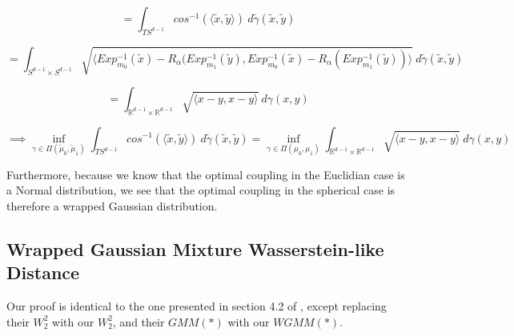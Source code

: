 \documentclass[]{article}
\begin{document}

\begin{equation*}
	= \int_{TS^{d-1}} cos^{-1}(\langle \tilde{x}, \tilde{y} \rangle) \ d\tilde{\gamma}(\tilde{x},\tilde{y})
\end{equation*}

\begin{equation*}
	= \int_{S^{d-1}\times S^{d-1}} \sqrt{\langle Exp_{m_0}^{-1}(\tilde{x}) - R_\alpha(Exp_{m_1}^{-1}(\tilde{y}), Exp_{m_0}^{-1}(\tilde{x}) - R_\alpha(Exp_{m_1}^{-1}(\tilde{y})) \rangle} \ d\tilde{\gamma}(\tilde{x},\tilde{y})
\end{equation*}


\begin{equation*}
	= \int_{\mathbb{R}^{d-1} \times \mathbb{R}^{d-1}} \sqrt{ \langle x - y, x-y\rangle} \ d\gamma(x,y)
\end{equation*}


\begin{equation}
	\implies \inf_{\gamma \in \Pi(\tilde{\mu}_0, \tilde{\mu}_1)} \int_{TS^{d-1}} cos^{-1}(\langle \tilde{x}, \tilde{y} \rangle) \ d\tilde{\gamma}(\tilde{x},\tilde{y}) = \inf_{\gamma \in \Pi({\mu}_0, {\mu}_1)} \int_{\mathbb{R}^{d-1} \times \mathbb{R}^{d-1}} \sqrt{ \langle x - y, x-y\rangle} \ d\gamma(x,y)
\end{equation}  


Furthermore, because we know that the optimal coupling in the Euclidian case is a Normal distribution, we see that the optimal coupling in the spherical case is therefore a wrapped Gaussian distribution. 

\subsection{Wrapped Gaussian Mixture Wasserstein-like Distance}

Our proof is identical to the one presented in section 4.2 of \cite{https://doi.org/10.48550/arxiv.1907.05254}, except replacing their $W_2^2$ with our $W_2^2$, and their $GMM(*)$ with our $WGMM(*)$. 




\newpage



\cite{https://doi.org/10.48550/arxiv.1907.05254}
\cite{https://doi.org/10.48550/arxiv.0801.2250}
\cite{10.1307/mmj/1029003026}
\cite{COTFNT}
\cite{Ambrosio2013}
\cite{WGOT}
\end{document}
